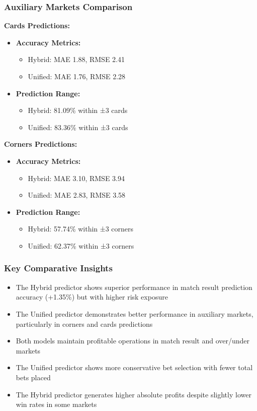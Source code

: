 \documentclass[conference]{IEEEtran}
\begin{document}
\subsubsection{Auxiliary Markets Comparison}
\textbf{Cards Predictions:}
\begin{itemize}
\item \textbf{Accuracy Metrics:}
    \begin{itemize}
    \item Hybrid: MAE 1.88, RMSE 2.41
    \item Unified: MAE 1.76, RMSE 2.28
    \end{itemize}
\item \textbf{Prediction Range:}
    \begin{itemize}
    \item Hybrid: 81.09\% within ±3 cards
    \item Unified: 83.36\% within ±3 cards
    \end{itemize}
\end{itemize}

\textbf{Corners Predictions:}
\begin{itemize}
\item \textbf{Accuracy Metrics:}
    \begin{itemize}
    \item Hybrid: MAE 3.10, RMSE 3.94
    \item Unified: MAE 2.83, RMSE 3.58
    \end{itemize}
\item \textbf{Prediction Range:}
    \begin{itemize}
    \item Hybrid: 57.74\% within ±3 corners
    \item Unified: 62.37\% within ±3 corners
    \end{itemize}
\end{itemize}

\subsubsection{Key Comparative Insights}
\begin{itemize}
\item The Hybrid predictor shows superior performance in match result prediction accuracy (+1.35\%) but with higher risk exposure
\item The Unified predictor demonstrates better performance in auxiliary markets, particularly in corners and cards predictions
\item Both models maintain profitable operations in match result and over/under markets
\item The Unified predictor shows more conservative bet selection with fewer total bets placed
\item The Hybrid predictor generates higher absolute profits despite slightly lower win rates in some markets
\end{itemize}
\end{document}
